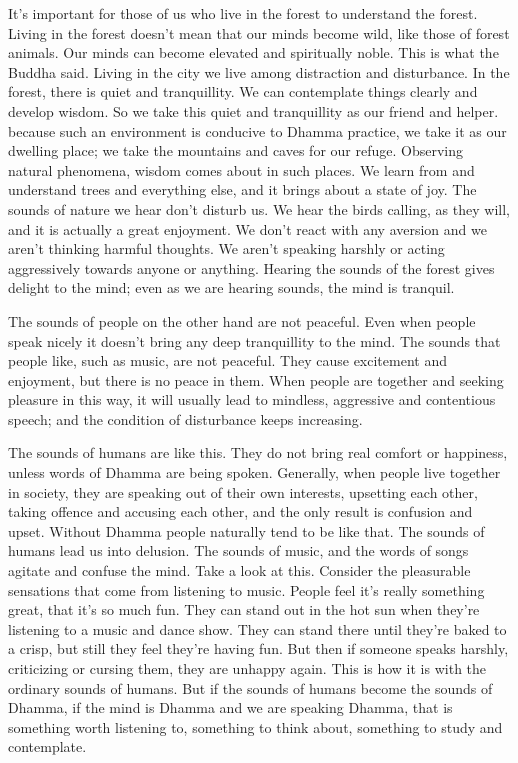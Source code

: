 It's important for those of us who live in the forest to understand the forest. Living in the forest doesn't mean that our minds become wild, like those of forest animals. Our minds can become elevated and spiritually noble. This is what the Buddha said. Living in the city we live among distraction and disturbance. In the forest, there is quiet and tranquillity. We can contemplate things clearly and develop wisdom. So we take this quiet and tranquillity as our friend and helper. because such an environment is conducive to Dhamma practice, we take it as our dwelling place; we take the mountains and caves for our refuge. Observing natural phenomena, wisdom comes about in such places. We learn from and understand trees and everything else, and it brings about a state of joy. The sounds of nature we hear don't disturb us. We hear the birds calling, as they will, and it is actually a great enjoyment. We don't react with any aversion and we aren't thinking harmful thoughts. We aren't speaking harshly or acting aggressively towards anyone or anything. Hearing the sounds of the forest gives delight to the mind; even as we are hearing sounds, the mind is tranquil. 

The sounds of people on the other hand are not peaceful. Even when people speak nicely it doesn't bring any deep tranquillity to the mind. The sounds that people like, such as music, are not peaceful. They cause excitement and enjoyment, but there is no peace in them. When people are together and seeking pleasure in this way, it will usually lead to mindless, aggressive and contentious speech; and the condition of disturbance keeps increasing. 

The sounds of humans are like this. They do not bring real comfort or happiness, unless words of Dhamma are being spoken. Generally, when people live together in society, they are speaking out of their own interests, upsetting each other, taking offence and accusing each other, and the only result is confusion and upset. Without Dhamma people naturally tend to be like that. The sounds of humans lead us into delusion. The sounds of music, and the words of songs agitate and confuse the mind. Take a look at this. Consider the pleasurable sensations that come from listening to music. People feel it's really something great, that it's so much fun. They can stand out in the hot sun when they're listening to a music and dance show. They can stand there until they're baked to a crisp, but still they feel they're having fun. But then if someone speaks harshly, criticizing or cursing them, they are unhappy again. This is how it is with the ordinary sounds of humans. But if the sounds of humans become the sounds of Dhamma, if the mind is Dhamma and we are speaking Dhamma, that is something worth listening to, something to think about, something to study and contemplate. 

